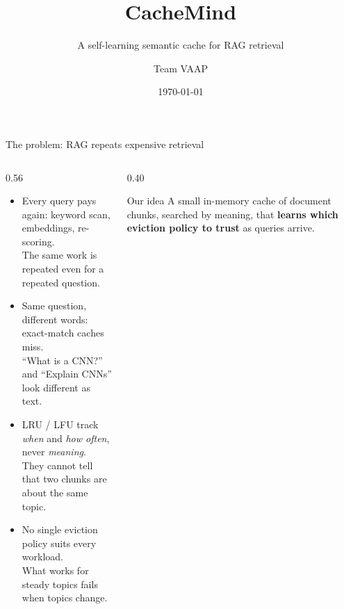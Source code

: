 \documentclass[aspectratio=169,11pt]{beamer}
\title[CacheMind]{CacheMind}
\subtitle{A self-learning semantic cache for RAG retrieval}
\author[Team VAAP]{Team VAAP}
\date{\today}
\newcommand{\say}[1]{\\ {\footnotesize\color{cmgrey}#1}}
\begin{document}
\begin{frame}
\titlepage
\end{frame}

\begin{frame}{The problem: RAG repeats expensive retrieval}
\begin{columns}[T,onlytextwidth]
\begin{column}{0.56\textwidth}
\begin{itemize}
  \setlength{\itemsep}{5pt}
  \item Every query pays again: keyword scan, embeddings, re-scoring.
        \say{The same work is repeated even for a repeated question.}
  \item Same question, different words: exact-match caches miss.
        \say{``What is a CNN?'' and ``Explain CNNs'' look different as text.}
  \item LRU / LFU track \emph{when} and \emph{how often}, never \emph{meaning}.
        \say{They cannot tell that two chunks are about the same topic.}
  \item No single eviction policy suits every workload.
        \say{What works for steady topics fails when topics change.}
\end{itemize}
\end{column}
\begin{column}{0.40\textwidth}
\begin{block}{Our idea}
\small
A small in-memory cache of document chunks, searched by meaning,
that \textbf{learns which eviction policy to trust} as queries arrive.
\end{block}
\end{column}
\end{columns}
\end{frame}
\end{document}
